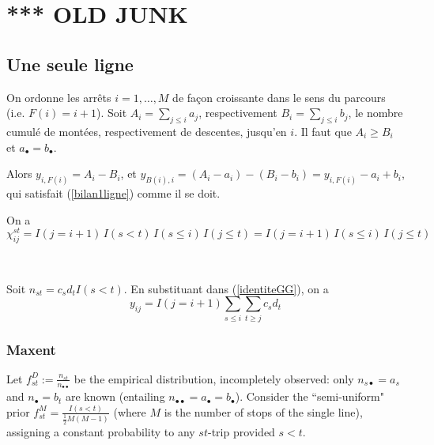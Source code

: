 \documentclass{article}
\theoremstyle{plain}
\begin{document}
\newpage

\section{*** OLD JUNK}

\subsection{Une seule ligne}
On ordonne les arrêts $i=1,\ldots, M$ de façon croissante dans le sens du parcours (i.e. $F(i)=i+1$). 
Soit $A_i=\sum_{j\le i}a_j$, respectivement $B_i=\sum_{j\le i}b_j$, le nombre cumulé de montées, respectivement de descentes, jusqu'en $i$. Il faut que $A_i\ge B_i$ et 
$a_{\bullet}=b_{\bullet}$. 

Alors $y_{i,F(i)}=A_i-B_i$, et $y_{B(i),i}=(A_i-a_i)-(B_i-b_i)=y_{i,F(i)}-a_i+b_i$, 	qui satisfait (\ref{bilan1ligne}) comme il se doit. 

On a $\chi_{ij}^{st}=I(j=i+1)\, I(s<t)\, I(s\le i)\, I(j\le t)=I(j=i+1)\,  I(s\le i)\, I(j\le t)$




\







Soit  $n_{st}=c_sd_t I(s<t)$. En substituant dans (\ref{identiteGG}), on a 
\begin{displaymath}
y_{ij}=I(j=i+1)\sum_{s\le i}\sum_{t\ge j}c_sd_t 
\end{displaymath}


\subsubsection{Maxent}
Let $f_{st}^D:=\frac{n_{st}}{n_{\bullet\bullet}}$ be the empirical distribution, incompletely observed: only $n_{s\bullet}=a_s$ and $n_{\bullet}=b_t$ are known (entailing
$n_{\bullet\bullet}=a_{\bullet}=b_{\bullet}$). Consider the ``semi-uniform" prior $f_{st}^M=\frac{I(s<t)}{\frac12 M(M-1)}$ (where $M$ is the number of stops of the single line), assigning a constant probability to any $st$-trip provided $s<t$. 

\
\end{document}
